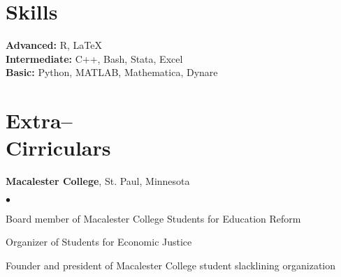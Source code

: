 \documentclass[margin,centered]{res}
\newenvironment{list1}{
  \begin{list}{\ding{113}}{%
      \setlength{\itemsep}{0in}
      \setlength{\parsep}{0in} \setlength{\parskip}{0in}
      \setlength{\topsep}{0in} \setlength{\partopsep}{0in}
      \setlength{\leftmargin}{0.17in}}}{\end{list}}
\newenvironment{list2}{
  \begin{list}{$\bullet$}{%
      \setlength{\itemsep}{0in}
      \setlength{\parsep}{0in} \setlength{\parskip}{0in}
      \setlength{\topsep}{0in} \setlength{\partopsep}{0in}
      \setlength{\leftmargin}{0.2in}}}{\end{list}}
\begin{document}
\begin{resume}



\section{\sc Skills}
{\bf Advanced:} R, LaTeX\\
{\bf Intermediate:} C++, Bash, Stata, Excel\\
{\bf Basic:} Python, MATLAB, Mathematica, Dynare



\section{\sc Extra-- \\ Cirriculars} 






{\bf Macalester College}, St. Paul, Minnesota
\begin{list1}
\item[]
\begin{list2}
\vspace*{.05in}
\item Board member of Macalester College Students for Education Reform
\item Organizer of Students for Economic Justice
\item Founder and president of Macalester College student slacklining organization
\end{list2}
\end{list1}



\end{resume}
\end{document}
